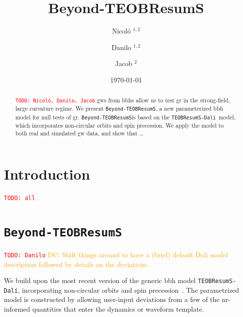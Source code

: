 \documentclass[prd,amssymb,amsmath,amsfonts,nofootinbib,reprint,showpacs,longbibliography]{revtex4-1}
\def\TEOBResumSDali{\texttt{TEOBResumS-Dalí}}
\def\TEOBB{\texttt{Beyond-TEOBResumS}}
\newcommand{\DC}[1]{{\textcolor{orange}{{DC: #1}} }}
\newcommand{\todo}[1]{\textcolor{red}{\texttt{TODO: #1}}}
\begin{document}
\title{Beyond-TEOBResumS}

\author{Nicol\'o ${}^{1,2}$}
\author{Danilo ${}^{1,2}$}
\author{Jacob ${}^{2}$}


\begin{abstract}
\todo{Nicol\'o, Danilo, Jacob}
\Acp{gw} from \acp{bbh} allow us to test \ac{gr} in the strong-field, large curvature regime.
We present \TEOBB, a new parameterized \ac{bbh} model for null tests of \ac{gr}.
\TEOBB is based on the \TEOBResumSDali~model, which incorporates non-circular orbits and spin precession.
We apply the model to both real and simulated \ac{gw} data, and show that \dots
\end{abstract}

\date{\today}
\maketitle

\acresetall

\section{Introduction}
\todo{all}

\section{\TEOBB}
\todo{Danilo}
\DC{Shift things around to have a (brief) default Dali model description followed by details on the deviations.}

We build upon the most recent version of the generic \ac{bbh} model \TEOBResumSDali, incorporating non-circular
orbits and spin precession~\cite{Nagar:2024oyk, Gamba:2024cvy, Albanesi:2025txj}. The parametrized model is constructed by
allowing user-input deviations from a few of the \ac{nr}-informed quantities that enter the dynamics or waveform
template. 
\end{document}
